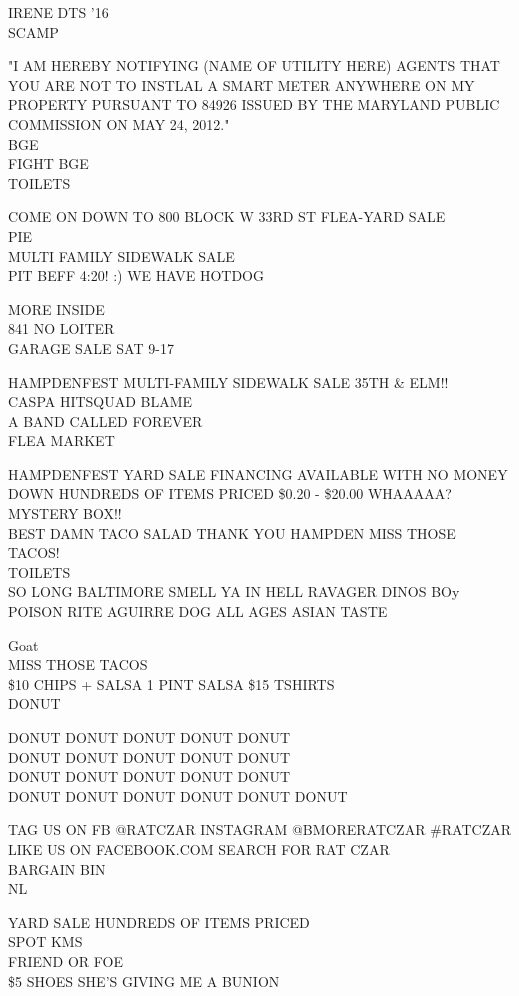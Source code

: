 \documentclass[10pt,letterpaper]{article}
\begin{document}
IRENE DTS '16\\
SCAMP

"I AM HEREBY NOTIFYING (NAME OF UTILITY HERE) AGENTS THAT YOU ARE NOT TO INSTLAL A SMART METER ANYWHERE ON MY PROPERTY PURSUANT TO 84926 ISSUED BY THE MARYLAND PUBLIC COMMISSION ON MAY 24, 2012."\\
BGE\\
FIGHT BGE\\
TOILETS

COME ON DOWN TO 800 BLOCK W 33RD ST FLEA{-}YARD SALE\\
PIE\\
MULTI FAMILY SIDEWALK SALE\\
PIT BEFF 4:20! :) WE HAVE HOTDOG

MORE INSIDE\\
841 NO LOITER\\
GARAGE SALE SAT 9{-}17

HAMPDENFEST MULTI{-}FAMILY SIDEWALK SALE 35TH \& ELM!!\\
CASPA HITSQUAD BLAME\\
A BAND CALLED FOREVER\\
FLEA MARKET

HAMPDENFEST YARD SALE FINANCING AVAILABLE WITH NO MONEY DOWN HUNDREDS OF ITEMS PRICED \$0.20 {-} \$20.00 WHAAAAA?  MYSTERY BOX!!\\
BEST DAMN TACO SALAD THANK YOU HAMPDEN MISS THOSE TACOS!\\
TOILETS\\
SO LONG BALTIMORE SMELL YA IN HELL RAVAGER DINOS BOy POISON RITE AGUIRRE DOG ALL AGES ASIAN TASTE

Goat\\
MISS THOSE TACOS\\
\$10 CHIPS + SALSA 1 PINT SALSA \$15 TSHIRTS\\
DONUT

DONUT DONUT DONUT DONUT DONUT\\
DONUT DONUT DONUT DONUT DONUT\\
DONUT DONUT DONUT DONUT DONUT\\
DONUT DONUT DONUT DONUT DONUT DONUT

TAG US ON FB @RATCZAR INSTAGRAM @BMORERATCZAR \#RATCZAR\\
LIKE US ON FACEBOOK.COM SEARCH FOR RAT CZAR\\
BARGAIN BIN\\
NL

YARD SALE HUNDREDS OF ITEMS PRICED\\
SPOT KMS\\
FRIEND OR FOE\\
\$5 SHOES SHE'S GIVING ME A BUNION
\end{document}
